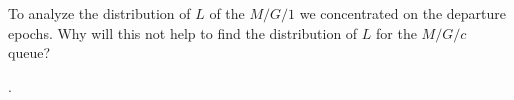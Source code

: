 \begin{question}[use=false]
  To analyze the distribution of $L$ of the $M/G/1$ we concentrated on
  the departure epochs. Why will this not help to find the
  distribution of $L$ for the $M/G/c$ queue?
  \begin{solution}
    \TBD.
  \end{solution}
\end{question}





